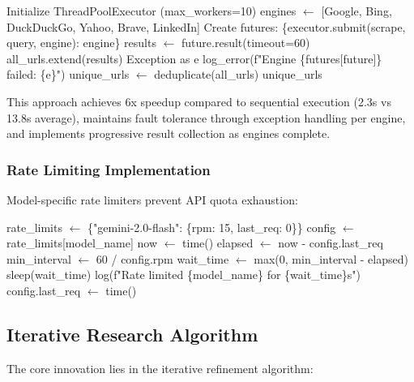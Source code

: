 \documentclass[conference]{IEEEtran}
\begin{document}
\begin{algorithm}
\caption{Parallel Multi-Engine Scraping}
\begin{algorithmic}[1]
\STATE Initialize ThreadPoolExecutor (max\_workers=10)
\STATE engines $\gets $ [Google, Bing, DuckDuckGo, Yahoo, Brave, LinkedIn]
\STATE Create futures: \{executor.submit(scrape, query, engine): engine\}
\TRY
\STATE results $\gets$ future.result(timeout=60)
\STATE all\_urls.extend(results)
\CATCH Exception as e
\STATE log\_error(f"Engine \{futures[future]\} failed: \{e\}")
\ENDTRY
\ENDFOR
\STATE unique\_urls $\gets$ deduplicate(all\_urls)
\RETURN unique\_urls
\end{algorithmic}
\end{algorithm}

This approach achieves 6x speedup compared to sequential execution (2.3s vs 13.8s average), maintains fault tolerance through exception handling per engine, and implements progressive result collection as engines complete.

\subsubsection{Rate Limiting Implementation}
Model-specific rate limiters prevent API quota exhaustion:

\begin{algorithm}
\caption{Adaptive Rate Limiting}
\begin{algorithmic}[1]
\STATE rate\_limits $\gets$ \{"gemini-2.0-flash": \{rpm: 15, last\_req: 0\}\}
\STATE config $\gets$ rate\_limits[model\_name]
\STATE now $\gets$ time()
\STATE elapsed $\gets$ now - config.last\_req
\STATE min\_interval $\gets$ 60 / config.rpm
\STATE wait\_time $\gets$ max(0, min\_interval - elapsed)
\STATE sleep(wait\_time)
\STATE log(f"Rate limited \{model\_name\} for \{wait\_time\}s")
\ENDIF
\STATE config.last\_req $\gets$ time()
\ENDFUNCTION
\end{algorithmic}
\end{algorithm}

\subsection{Iterative Research Algorithm}

The core innovation lies in the iterative refinement algorithm:
\end{document}
